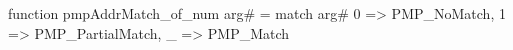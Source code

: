 function pmpAddrMatch_of_num arg# = match arg# {
  0 => PMP_NoMatch,
  1 => PMP_PartialMatch,
  _ => PMP_Match
}
